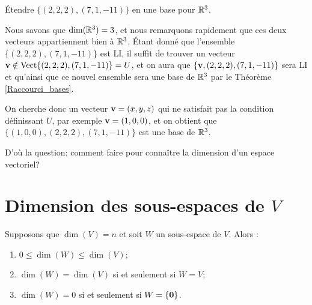 \begin{myprob} Étendre $\{(2,2,2), (7,1,-11)\}$ en une base pour $\mathbb{R}^3$.

\begin{mysol} Nous savons que $\dim(\mathbb{R}^3) = 3$, et nous remarquons rapidement que ces deux vecteurs appartiennent bien à $\mathbb{R}^3$. Étant donné que l'ensemble $\{(2,2,2), (7,1,-11)\}$ est LI, 
il suffit de trouver un vecteur $\mathbf{v}\notin \operatorname{ Vect} \normalsize\{(2,2,2), (7,1,-11)\normalsize\}=U$, et on aura que $\{\mathbf{v}, (2,2,2), (7,1,-11)\}$ sera LI et qu'ainsi que ce nouvel ensemble sera une base de $\mathbb{R}^3$ par le Théorème \ref{Raccourci_bases}.

On cherche donc un vecteur $\mathbf{v}=(x,y,z)$ qui ne satisfait pas la condition définissant $U$, par exemple $\mathbf{v} = (1,0,0)$, et on obtient que $\{(1,0,0), (2,2,2), (7,1,-11)\}$ est une base de $\mathbb{R}^3$.
\end{mysol}\end{myprob}


D'o\`u la question: comment faire pour connaître la dimension d'un espace vectoriel?


\section{Dimension des sous-espaces de $V$}

\begin{theorem}  \label{dimsubspaces}
 Supposons que $\dim(V) = n$ et soit 
$W$ un sous-espace de $V$.  Alors :
\begin{enumerate}
\item $0 \leq \dim(W) \leq \dim(V)$;
\item $\dim(W) = \dim(V)$ si et seulement si $W=V$;
\item $\dim(W)=0$ si et seulement si $W = \{\mathbf{0}\}$.
\end{enumerate}
\end{theorem}

